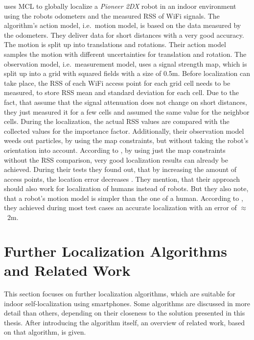 \citet{siddiqi:experiments_mcl_wifi} uses \ac{MCL} to globally localize a \emph{Pioneer 2DX} robot in an indoor environment using the robots odometers and the measured \ac{RSS} of WiFi signals. The algorithm's action model, i.e.\ motion model, is based on the data measured by the odometers. They deliver data for short distances with a very good accuracy. The motion is split up into translations and rotations. Their action model samples the motion with different uncertainties for translation and rotation. The observation model, i.e.\ measurement model, uses a signal strength map, which is split up into a grid with squared fields with a size of 0.5m. Before localization can take place, the \ac{RSS} of each WiFi access point for each grid cell needs to be measured, to store \ac{RSS} mean and standard deviation for each cell. Due to the fact, that \citet{siddiqi:experiments_mcl_wifi} assume that the signal attenuation does not change on short distances, they just measured it for a few cells and assumed the same value for the neighbor cells. During the localization, the actual \ac{RSS} values are compared with the collected values for the importance factor. Additionally, their observation model weeds out particles, by using the map constraints, but without taking the robot's orientation into account. According to \citet{siddiqi:experiments_mcl_wifi}, by using just the map constraints without the \ac{RSS} comparison, very good localization results can already be achieved.
During their tests they found out, that by increasing the amount of access points, the location error decreases \citep{siddiqi:experiments_mcl_wifi}. They mention, that their approach should also work for localization of humans instead of robots. But they also note, that a robot's motion model is simpler than the one of a human. According to \citet{siddiqi:experiments_mcl_wifi}, they achieved during most test cases an accurate localization with an error of $\approx$~2m.


\section{Further Localization Algorithms and Related Work}
This section focuses on further localization algorithms, which are suitable for indoor self-localization using smartphones. Some algorithms are discussed in more detail than others, depending on their closeness to the solution presented in this thesis. After introducing the algorithm itself, an overview of related work, based on that algorithm, is given.

